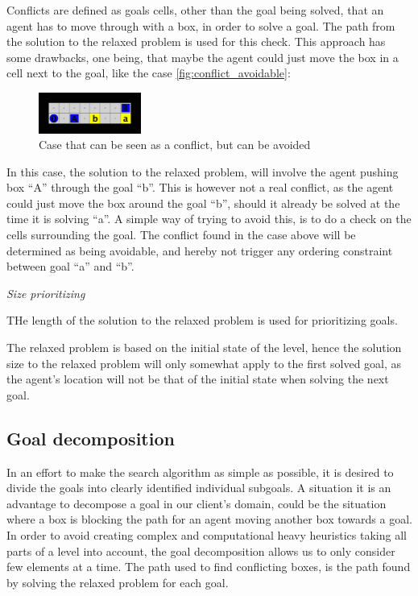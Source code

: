 \documentclass[Main]{subfiles}
\begin{document}
Conflicts are defined as goals cells, other than the goal being solved, that an agent has to move through with a box, in order to solve a goal. The path from the solution to the relaxed problem is used for this check. This approach has some drawbacks, one being, that maybe the agent could just move the box in a cell next to the goal, like the case \autoref{fig:conflict_avoidable}:
\begin{figure}[h!]
    \centering
    \includegraphics[width=0.3\textwidth]{conflict.png}
    \caption{Case that can be seen as a conflict, but can be avoided}
    \label{fig:conflict_avoidable}
\end{figure}


In this case, the solution to the relaxed problem, will involve the agent pushing box ``A'' through the goal ``b''. This is however not a real conflict, as the agent could just move the box around the goal ``b'', should it already be solved at the time it is solving ``a''. A simple way of trying to avoid this, is to do a check on the cells surrounding the goal. 
The conflict found in the case above will be determined as being avoidable, and hereby not trigger any ordering constraint between goal ``a'' and ``b''. 


\textit{Size prioritizing} 

THe length of the solution to the relaxed problem is used for prioritizing goals. 

The relaxed problem is based on the initial state of the level, hence the solution size to the relaxed problem will only somewhat apply to the first solved goal, as the agent's location will not be that of the initial state when solving the next goal. 



\subsection{Goal decomposition}
In an effort to make the search algorithm as simple as possible, it is desired to divide the goals into clearly identified individual subgoals. A situation it is an advantage to decompose a goal in our client's domain, could be the situation where a box is blocking the path for an agent moving another box towards a goal. In order to avoid creating complex and computational heavy heuristics taking all parts of a level into account, the goal decomposition allows us to only consider few elements at a time. The path used to find conflicting boxes, is the path found by solving the relaxed problem for each goal.
\end{document}
